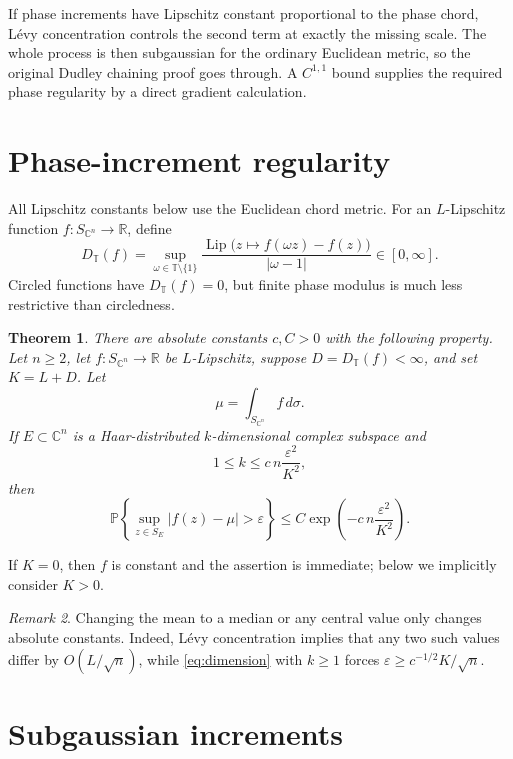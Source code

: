 \documentclass[11pt]{article}
\newtheorem{theorem}{Theorem}
\theoremstyle{remark}
\newtheorem{remark}[theorem]{Remark}
\newcommand{\C}{\mathbb C}
\newcommand{\R}{\mathbb R}
\newcommand{\T}{\mathbb T}
\newcommand{\Lip}{\operatorname{Lip}}
\begin{document}
If phase increments have Lipschitz constant proportional to the phase chord,
L\'evy concentration controls the second term at exactly the missing scale.
The whole process is then subgaussian for the ordinary Euclidean metric, so
the original Dudley chaining proof goes through.  A \(C^{1,1}\) bound supplies
the required phase regularity by a direct gradient calculation.

\section{Phase-increment regularity}

All Lipschitz constants below use the Euclidean chord metric.  For an
\(L\)-Lipschitz function \(f:S_{\C^n}\to\R\), define
\begin{equation}\label{eq:phase-modulus}
 D_{\T}(f)=
 \sup_{\omega\in\T\setminus\{1\}}
 \frac{\Lip\bigl(z\mapsto f(\omega z)-f(z)\bigr)}
      {|\omega-1|}\in[0,\infty].
\end{equation}
Circled functions have \(D_{\T}(f)=0\), but finite phase modulus is much less
restrictive than circledness.

\begin{theorem}\label{thm:main}
There are absolute constants \(c,C>0\) with the following property.  Let
\(n\geq2\), let \(f:S_{\C^n}\to\R\) be \(L\)-Lipschitz, suppose
\(D=D_{\T}(f)<\infty\), and set \(K=L+D\).  Let
\[
 \mu=\int_{S_{\C^n}}f\,d\sigma.
\]
If \(E\subset\C^n\) is a Haar-distributed \(k\)-dimensional complex subspace
and
\begin{equation}\label{eq:dimension}
 1\leq k\leq c\,n\frac{\varepsilon^2}{K^2},
\end{equation}
then
\[
 \mathbb P\left\{
   \sup_{z\in S_E}|f(z)-\mu|>\varepsilon
 \right\}
 \leq
 C\exp\left(-c\,n\frac{\varepsilon^2}{K^2}\right).
\]
\end{theorem}

If \(K=0\), then \(f\) is constant and the assertion is immediate; below we
implicitly consider \(K>0\).

\begin{remark}
Changing the mean to a median or any central value only changes absolute
constants.  Indeed, L\'evy concentration implies that any two such values
differ by \(O(L/\sqrt n)\), while \eqref{eq:dimension} with \(k\geq1\)
forces \(\varepsilon\geq c^{-1/2}K/\sqrt n\).
\end{remark}

\section{Subgaussian increments}
\end{document}
